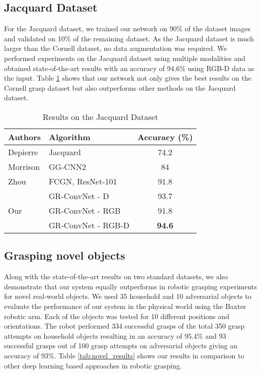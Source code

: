 \documentclass[letterpaper, 10pt, conference]{IEEEtran}
\begin{document}
\subsection{Jacquard Dataset} \label{Jacquard results}
For the Jacquard dataset, we trained our network on 90\% of the dataset images and validated on 10\% of the remaining dataset. As the Jacquard dataset is much larger than the Cornell dataset, no data augmentation was required. We performed experiments on the Jacquard dataset using multiple modalities and obtained state-of-the-art results with an accuracy of 94.6\% using RGB-D data as the input. Table \ref{tab:jacquard_results} shows that our network not only gives the best results on the Cornell grasp dataset but also outperforms other methods on the Jacquard dataset.


\begin{table}
\vspace*{0.1cm}
\begin{center}
\caption{Results on the Jacquard Dataset}
\label{tab:jacquard_results}
\begin{tabular}{llc}
\hline
\textbf{Authors} & \textbf{Algorithm} & \textbf{Accuracy (\%)} \\
\hline
Depierre \cite{depierre2018jacquard} & Jacquard & 74.2 \\
Morrison \cite{morrison2019learning} & GG-CNN2 & 84 \\
Zhou \cite{zhou2018fully} & FCGN, ResNet-101 & 91.8 \\
\hline
 & GR-ConvNet - D & 93.7 \\
Our & GR-ConvNet - RGB & 91.8 \\
 & GR-ConvNet - RGB-D & \textbf{94.6} \\
\hline
\end{tabular}
\end{center}
\end{table}

\subsection{Grasping novel objects}
Along with the state-of-the-art results on two standard datasets, we also demonstrate that our system equally outperforms in robotic grasping experiments for novel real-world objects. We used 35 household and 10 adversarial objects to evaluate the performance of our system in the physical world using the Baxter robotic arm. Each of the objects was tested for 10 different positions and orientations. The robot performed 334 successful grasps of the total 350 grasp attempts on household objects resulting in an accuracy of 95.4\% and 93 successful grasps out of 100 grasp attempts on adversarial objects giving an accuracy of 93\%. Table \ref{tab:novel_results} shows our results in comparison to other deep learning based approaches in robotic grasping. 
\end{document}
